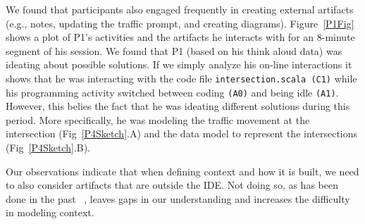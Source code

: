 We found that participants also engaged frequently in creating external artifacts (e.g., notes, updating the traffic prompt, and creating diagrams). Figure~\ref{P1Fig} shows a plot of P1's activities and the artifacts he interacts with for an 8-minute segment of his session. We found that P1 (based on his think aloud data) was ideating about possible solutions. If we simply analyze his on-line interactions it shows that he was interacting with the code file \texttt{intersection.scala (C1)} while his programming activity switched between coding \texttt{(A0)} and being idle \texttt{(A1)}. However, this belies the fact that he was ideating different solutions during this period. More specifically, he was modeling the traffic movement at the intersection (Fig~\ref{P4Sketch}.A) and the data model to represent the  intersections (Fig~\ref{P4Sketch}.B).


Our observations indicate that when defining context and how it is built, we need to also consider artifacts that are outside the IDE. Not doing so, as has been done in the past ~\cite{Gasparic:2017,Kersten:2006}, leaves gaps in our understanding and increases the difficulty in modeling context.






